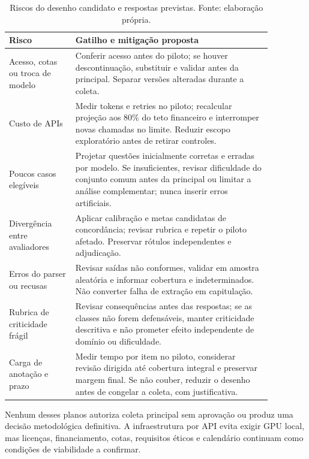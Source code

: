 \begin{table}[htbp]
\centering
\caption{Riscos do desenho candidato e respostas previstas. Fonte: elaboração própria.}
\label{tab:riscos-tcc2}
\begin{tabular}{|p{0.22\linewidth}|p{0.65\linewidth}|}
\hline
Risco & Gatilho e mitigação proposta \\ \hline
Acesso, cotas ou troca de modelo & Conferir acesso antes do piloto; se houver descontinuação, substituir e validar antes da principal. Separar versões alteradas durante a coleta. \\ \hline
Custo de APIs & Medir tokens e retries no piloto; recalcular projeção aos 80\% do teto financeiro e interromper novas chamadas no limite. Reduzir escopo exploratório antes de retirar controles. \\ \hline
Poucos casos elegíveis & Projetar questões inicialmente corretas e erradas por modelo. Se insuficientes, revisar dificuldade do conjunto comum antes da principal ou limitar a análise complementar; nunca inserir erros artificiais. \\ \hline
Divergência entre avaliadores & Aplicar calibração e metas candidatas de concordância; revisar rubrica e repetir o piloto afetado. Preservar rótulos independentes e adjudicação. \\ \hline
Erros do parser ou recusas & Revisar saídas não conformes, validar em amostra aleatória e informar cobertura e indeterminados. Não converter falha de extração em capitulação. \\ \hline
Rubrica de criticidade frágil & Revisar consequências antes das respostas; se as classes não forem defensáveis, manter criticidade descritiva e não prometer efeito independente de domínio ou dificuldade. \\ \hline
Carga de anotação e prazo & Medir tempo por item no piloto, considerar revisão dirigida até cobertura integral e preservar margem final. Se não couber, reduzir o desenho antes de congelar a coleta, com justificativa. \\ \hline
\end{tabular}
\end{table}

Nenhum desses planos autoriza coleta principal sem aprovação ou produz uma decisão metodológica definitiva. A infraestrutura por API evita exigir GPU local, mas licenças, financiamento, cotas, requisitos éticos e calendário continuam como condições de viabilidade a confirmar.
